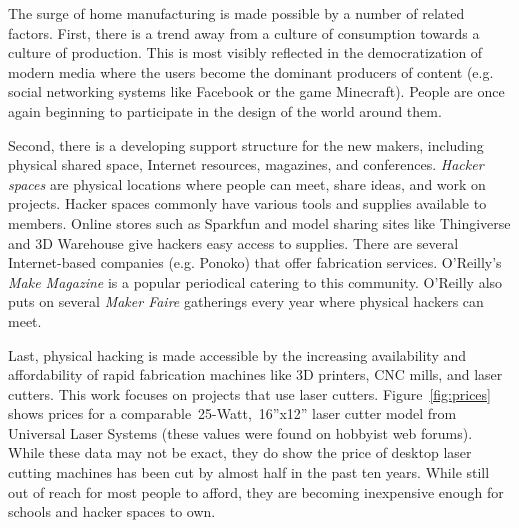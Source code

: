 \documentclass[11pt]{article}
\begin{document}
The surge of home manufacturing is made possible by a number of
related factors. First, there is a trend away from a culture of
consumption towards a culture of production. This is most visibly
reflected in the democratization of modern media where the users
become the dominant producers of content (e.g. social networking
systems like Facebook or the game Minecraft). People are once again
beginning to participate in the design of the world around them.

Second, there is a developing support structure for the new makers,
including physical shared space, Internet resources, magazines, and
conferences. \textit{Hacker spaces} are physical locations where
people can meet, share ideas, and work on projects. Hacker spaces
commonly have various tools and supplies available to members. Online
stores such as Sparkfun and model sharing sites like Thingiverse and
3D Warehouse give hackers easy access to supplies. There are several
Internet-based companies (e.g. Ponoko) that offer fabrication
services. O'Reilly's \textit{Make Magazine} is a popular periodical
catering to this community. O'Reilly also puts on several
\textit{Maker Faire} gatherings every year where physical hackers can
meet.

Last, physical hacking is made accessible by the increasing
availability and affordability of rapid fabrication machines like 3D
printers, CNC mills, and laser cutters. This work focuses on projects
that use laser cutters. Figure~\ref{fig:prices} shows prices for a
comparable~25-Watt,~16''x12'' laser cutter model from Universal Laser
Systems (these values were found on hobbyist web forums). While these
data may not be exact, they do show the price of desktop laser cutting
machines has been cut by almost half in the past ten years. While
still out of reach for most people to afford, they are becoming
inexpensive enough for schools and hacker spaces to own.

%
\end{document}
